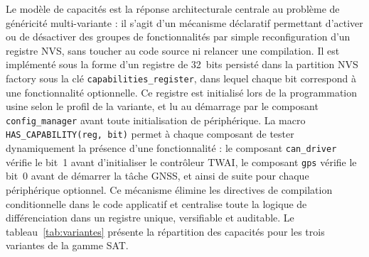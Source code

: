 Le modèle de capacités est la réponse architecturale centrale au
problème de généricité multi-variante : il s'agit d'un mécanisme
déclaratif permettant d'activer ou de désactiver des groupes de
fonctionnalités par simple reconfiguration d'un registre NVS, sans
toucher au code source ni relancer une compilation. Il est implémenté
sous la forme d'un registre de 32~bits persisté dans la partition NVS
factory sous la clé \texttt{capabilities\_register}, dans lequel
chaque bit correspond à une fonctionnalité optionnelle. Ce registre
est initialisé lors de la programmation usine selon le profil de la
variante, et lu au démarrage par le composant \texttt{config\_manager}
avant toute initialisation de périphérique. La macro
\texttt{HAS\_CAPABILITY(reg, bit)} permet à chaque composant de tester
dynamiquement la présence d'une fonctionnalité : le composant
\texttt{can\_driver} vérifie le bit~1 avant d'initialiser le
contrôleur TWAI, le composant \texttt{gps} vérifie le bit~0 avant de
démarrer la tâche GNSS, et ainsi de suite pour chaque périphérique
optionnel. Ce mécanisme élimine les directives de compilation
conditionnelle dans le code applicatif et centralise toute la logique
de différenciation dans un registre unique, versifiable et auditable.
Le tableau~\ref{tab:variantes} présente la répartition des capacités
pour les trois variantes de la gamme SAT.

